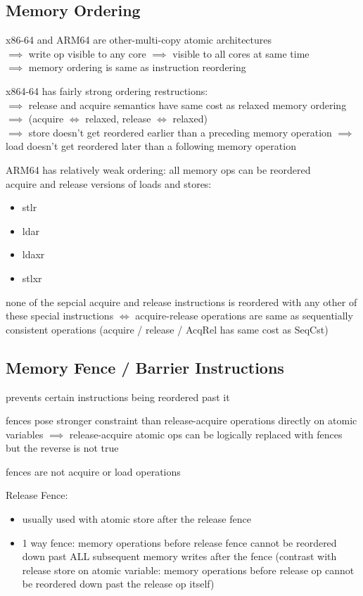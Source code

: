 \documentclass[8pt]{extarticle}
\begin{document}
\begin{multicols*}{2}
    \subsection{Memory Ordering}
    x86-64 and ARM64 are other-multi-copy atomic architectures\\
    $\implies$ write op visible to any core $\implies$ visible to all cores at same time\\
    $\implies$ memory ordering is same as instruction reordering

    x864-64 has fairly strong ordering restructions:\\
    $\implies$ release and acquire semantics have same cost as relaxed memory ordering\\
    $\implies$ (acquire $\iff$ relaxed, release $\iff$ relaxed)\\
    $\implies$ store doesn't get reordered earlier than a preceding memory operation
    $\implies$ load doesn't get reordered later than a following memory operation

    ARM64 has relatively weak ordering: all memory ops can be reordered\\
    acquire and release versions of loads and stores:
    \begin{itemize}
    \item stlr
    \item ldar
    \item ldaxr
    \item stlxr
    \end{itemize}

    none of the sepcial acquire and release instructions is reordered with any other of these special instructions
    $\iff$ acquire-release operations are same as sequentially consistent operations (acquire / release / AcqRel has same cost as SeqCst)

    \subsection{Memory Fence / Barrier Instructions}

    prevents certain instructions being reordered past it

    fences pose stronger constraint than release-acquire operations directly on atomic variables $\implies$ release-acquire atomic ops can be logically replaced with fences but the reverse is not true

    fences are not acquire or load operations

    Release Fence:
    \begin{itemize}
    \item usually used with atomic store after the release fence
    \item 1 way fence: memory operations before release fence cannot be reordered down past ALL subsequent memory writes after the fence (contrast with release store on atomic variable: memory operations before release op cannot be reordered down past the release op itself)
    \end{itemize}


\end{multicols*}
\end{document}
